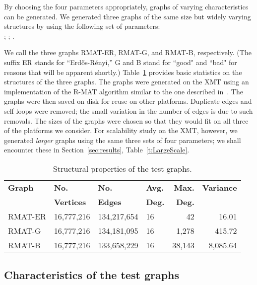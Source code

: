 \documentclass{article}
\begin{document}
By choosing the four parameters appropriately, graphs of varying characteristics can be generated. 
We generated three graphs of the same size but widely varying structures by 
using the following set of parameters: \\
; ; . 

We call the three graphs RMAT-ER, RMAT-G, and RMAT-B, respectively.
(The suffix ER stands for ``Erd\H os-R\'enyi,''
G and B stand for ``good" and ``bad" for reasons that will be apparent shortly.)
Table~\ref{t:prop} provides basic statistics on the structures of the three graphs.
The graphs were generated on the XMT using an implementation of the R-MAT algorithm 
similar to the one  described in~\cite{SSCA}. 
The graphs were then saved on disk for reuse on other platforms. 
Duplicate edges and self loops were removed;
the small variation in the number of edges is due to such removals. 
The sizes of the graphs were chosen so that they would fit on 
all three of the platforms we consider. 
For scalability study on the XMT, however, we generated {\em larger} graphs 
using the same three sets of four parameters; 
we shall encounter these in Section~\ref{sec:results}, Table~\ref{t:LargeScale}.

\begin{table}
\begin{footnotesize}
\centering
\begin{tabular}{|l|l|l|l|r|r|}
\hline
\textbf{Graph} & \textbf{No. } & \textbf{No.} &  \textbf{Avg.} &
\textbf{Max.} & \textbf{Variance}  \\ 
& \textbf{Vertices} & \textbf{Edges} &  \textbf{Deg.} &
\textbf{Deg.} & \\ \hline \hline
RMAT-ER		&  16,777,216 &    134,217,654 &  16 & 42     &  16.01    \\ \hline
RMAT-G	        &  16,777,216 &    134,181,095 &  16 & 1,278  &  415.72   \\ \hline
RMAT-B	        &  16,777,216 &    133,658,229 &  16 & 38,143 &  8,085.64 \\ \hline
\end{tabular}
\caption{Structural properties of the test graphs.}
\label{t:prop}
\end{footnotesize}
\end{table}


\subsection{Characteristics of the test graphs}
\end{document}
